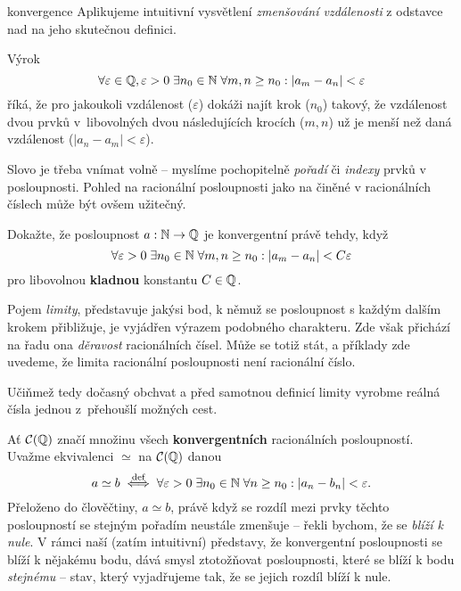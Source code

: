 \begin{remark}{}{konvergence}
 Aplikujeme intuitivní vysvětlení \emph{zmenšování vzdálenosti} z odstavce nad
  na jeho skutečnou definici.

 Výrok
 \[
  \forall \varepsilon \in \mathbb{Q}, \varepsilon>0 \; \exists n_0 \in \mathbb{N} \; \forall m,n
  \geq n_0: |a_m - a_n| < \varepsilon
 \]
 říká, že pro jakoukoli vzdálenost ($\varepsilon$) dokáži najít krok ($n_0$)
 takový, že vzdálenost dvou prvků v~libovolných dvou následujících krocích
 ($m,n$) už je menší než daná vzdálenost ($|a_n -a_m|<\varepsilon$).

 Slovo  je třeba vnímat volně -- myslíme pochopitelně \emph{pořadí} či
 \emph{indexy} prvků v posloupnosti. Pohled na racionální posloupnosti jako na
  činěné v racionálních číslech může být ovšem užitečný.
\end{remark}

\begin{exercise}{}{}
 Dokažte, že posloupnost $a:\mathbb{N} \to \mathbb{Q}$ je konvergentní právě tehdy, když
 \[
  \forall \varepsilon>0 \; \exists n_0 \in \mathbb{N} \; \forall m,n \geq n_0: |a_m -
  a_n| < C\varepsilon
 \]
 pro libovolnou \textbf{kladnou} konstantu $C \in \mathbb{Q}$.
\end{exercise}

Pojem \emph{limity}, představuje jakýsi bod, k němuž se posloupnost s každým
dalším krokem přibližuje, je vyjádřen výrazem podobného charakteru. Zde však
přichází na řadu ona \emph{děravost} racionálních čísel. Může se totiž stát, a
příklady zde uvedeme, že limita racionální posloupnosti není racionální číslo.

Učiňmež tedy dočasný obchvat a před samotnou definicí limity vyrobme reálná
čísla jednou z~přehoušlí možných cest.

Ať $\mathcal{C}(\mathbb{Q})$ značí množinu všech \textbf{konvergentních }racionálních
posloupností. Uvažme ekvivalenci $ \simeq $ na $\mathcal{C}(\mathbb{Q})$ danou
\[
 a \simeq b \overset{\text{def}}{\iff} \forall \varepsilon>0 \; \exists n_0 \in \mathbb{N}
 \; \forall n \geq n_0: |a_n - b_n| < \varepsilon.
\]
Přeloženo do člověčtiny, $a \simeq b$, právě když se rozdíl mezi prvky těchto
posloupností se stejným pořadím neustále zmenšuje -- řekli bychom, že se
\emph{blíží k nule}. V rámci naší (zatím intuitivní) představy, že konvergentní
posloupnosti se blíží k nějakému bodu, dává smysl ztotožňovat posloupnosti,
které se blíží k bodu \emph{stejnému} -- stav, který vyjadřujeme tak, že se
jejich rozdíl blíží k nule.

